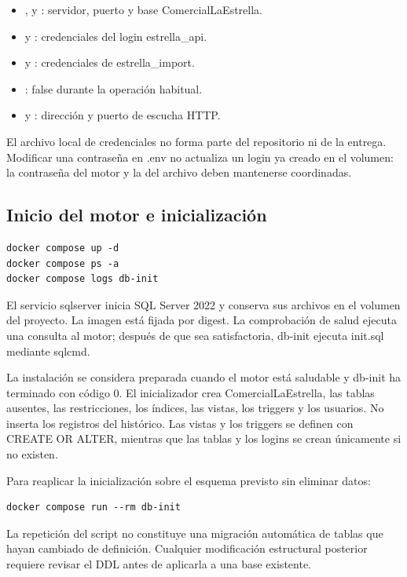 \documentclass[10pt,letterpaper]{article}
\begin{document}
\begin{itemize}
\item {},  y : servidor, puerto y base ComercialLaEstrella.
\item {} y : credenciales del login estrella\_api.
\item {} y : credenciales de estrella\_import.
\item {}: false durante la operación habitual.
\item {} y : dirección y puerto de escucha HTTP.
\end{itemize}

El archivo local de credenciales no forma parte del repositorio ni de la entrega. Modificar una contraseña en .env no actualiza un login ya creado en el volumen: la contraseña del motor y la del archivo deben mantenerse coordinadas.

\subsection{Inicio del motor e inicialización}
\begin{lstlisting}
docker compose up -d
docker compose ps -a
docker compose logs db-init
\end{lstlisting}
El servicio sqlserver inicia SQL Server 2022 y conserva sus archivos en el volumen del proyecto. La imagen está fijada por digest. La comprobación de salud ejecuta una consulta al motor; después de que sea satisfactoria, db-init ejecuta init.sql mediante sqlcmd.

La instalación se considera preparada cuando el motor está saludable y db-init ha terminado con código 0. El inicializador crea ComercialLaEstrella, las tablas ausentes, las restricciones, los índices, las vistas, los triggers y los usuarios. No inserta los registros del histórico. Las vistas y los triggers se definen con CREATE OR ALTER, mientras que las tablas y los logins se crean únicamente si no existen.

Para reaplicar la inicialización sobre el esquema previsto sin eliminar datos:
\begin{lstlisting}
docker compose run --rm db-init
\end{lstlisting}
La repetición del script no constituye una migración automática de tablas que hayan cambiado de definición. Cualquier modificación estructural posterior requiere revisar el DDL antes de aplicarla a una base existente.
\end{document}
